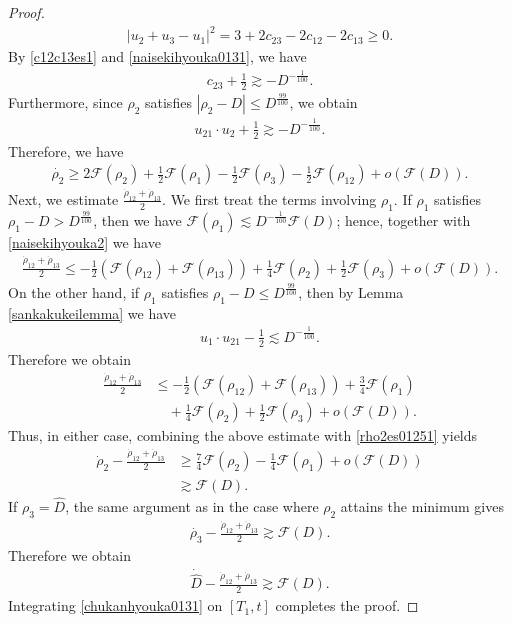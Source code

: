 \documentclass[reqno]{amsart}
\theoremstyle{plain}
\theoremstyle{definition}
\numberwithin{equation}{section}
\newcommand{\1}{\mathbbm{1}}
\begin{document}
\begin{proof}
\begin{align}
|u_2+u_3-u_1|^2=3+2c_{23}-2c_{12}-2c_{13}\geq 0.
\end{align}
By \eqref{c12c13es1} and \eqref{naisekihyouka0131}, we have
\begin{align}\label{c23es1}
c_{23}+\frac{1}{2}\gtrsim -D^{-\frac{1}{100}}.
\end{align}
Furthermore, since $\rho_2$ satisfies $|\rho_2-D|\leq D^{\frac{99}{100}}$, we obtain
\begin{align}\label{naisekihyouka2}
u_{21}\cdot u_2+\frac{1}{2}\gtrsim -D^{-\frac{1}{100}}.
\end{align}
Therefore, we have
\begin{align}\label{rho2es01251}
\dot{\rho_2}\geq 2\mathcal{F}(\rho_2)+\frac{1}{2}\mathcal{F}(\rho_1)-\frac{1}{2}\mathcal{F}(\rho_3)-\frac{1}{2}\mathcal{F}(\rho_{12})+o\left(\mathcal{F}(D)\right).
\end{align}
Next, we estimate $\frac{\dot{\rho}_{12}+\dot{\rho}_{13}}{2}$. We first treat the terms involving $\rho_1$.
If $\rho_1$ satisfies $\rho_1-D>D^{\frac{99}{100}}$, then we have $\mathcal{F}(\rho_1)\lesssim D^{-\frac{1}{100}}\mathcal{F}(D)$; hence, together with \eqref{naisekihyouka2} we have
\begin{align*}
\frac{\dot{\rho}_{12}+\dot{\rho}_{13}}{2}\leq -\frac{1}{2}\left(\mathcal{F}(\rho_{12})+\mathcal{F}(\rho_{13})\right)+\frac{1}{4}\mathcal{F}(\rho_2)+\frac{1}{2}\mathcal{F}(\rho_3)+o\left(\mathcal{F}(D)\right).
\end{align*}
On the other hand, if $\rho_1$ satisfies $\rho_1-D\leq D^{\frac{99}{100}}$, then by Lemma \ref{sankakukeilemma} we have
\begin{align*}
u_1\cdot u_{21}-\frac{1}{2}\lesssim D^{-\frac{1}{100}}.
\end{align*}
Therefore we obtain
\begin{align*}
\frac{\dot{\rho}_{12}+\dot{\rho}_{13}}{2}&\leq -\frac{1}{2}\left(\mathcal{F}(\rho_{12})+\mathcal{F}(\rho_{13})\right)+\frac{3}{4}\mathcal{F}(\rho_1)
\\
&\quad+\frac{1}{4}\mathcal{F}(\rho_2)+\frac{1}{2}\mathcal{F}(\rho_3)+o\left(\mathcal{F}(D)\right).
\end{align*}
Thus, in either case, combining the above estimate with \eqref{rho2es01251} yields
\begin{align*}
\dot{\rho}_2-\frac{\dot{\rho}_{12}+\dot{\rho}_{13}}{2}&\geq \frac{7}{4}\mathcal{F}(\rho_2)-\frac{1}{4}\mathcal{F}(\rho_1)+o\left(\mathcal{F}(D)\right)
\\
&\gtrsim \mathcal{F}(D).
\end{align*}
If $\rho_3=\hat{D}$, the same argument as in the case where $\rho_2$ attains the minimum gives
\begin{align*}
\dot{\rho_3}-\frac{\dot{\rho}_{12}+\dot{\rho}_{13}}{2}\gtrsim \mathcal{F}(D).
\end{align*}
Therefore we obtain
\begin{align}\label{chukanhyouka0131}
\dot{\hat{D}}-\frac{\dot{\rho}_{12}+\dot{\rho}_{13}}{2}\gtrsim \mathcal{F}(D).
\end{align}
Integrating \eqref{chukanhyouka0131} on $[T_1,t]$ completes the proof.
\end{proof}
\end{document}

